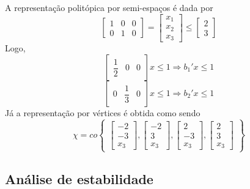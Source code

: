 \begin{observation}
\begin{example}
		A representação politópica por semi-espaços é dada por
		\begin{equation*}
		\begin{bmatrix}1&0&0\\0&1&0\end{bmatrix} = \begin{bmatrix}x_1\\x_2\\x_3\end{bmatrix} \leq \begin{bmatrix}2\\3\end{bmatrix}
		\end{equation*}
		Logo,
		\begin{equation*}
		\begin{bmatrix}\dfrac{1}{2}&0&0\end{bmatrix}x \leq 1\Rightarrow b_1'x\leq 1
		\end{equation*}
		\begin{equation*}
		\begin{bmatrix}0&\dfrac{1}{3}&0\end{bmatrix}x \leq 1\Rightarrow b_2'x\leq 1
		\end{equation*}
		Já a representação por vértices é obtida como sendo
		\begin{equation*}
		\chi = co\begin{Bmatrix}
		\begin{bmatrix}-2\\-3\\x_3\end{bmatrix},\begin{bmatrix}-2\\3\\x_3\end{bmatrix},\begin{bmatrix}2\\-3\\x_3\end{bmatrix},\begin{bmatrix}2\\3\\x_3\end{bmatrix}
		\end{Bmatrix}
		\end{equation*}
	\end{example}
\end{observation}

\subsection{Análise de estabilidade}\label{subsec:stabilily_analysis}

